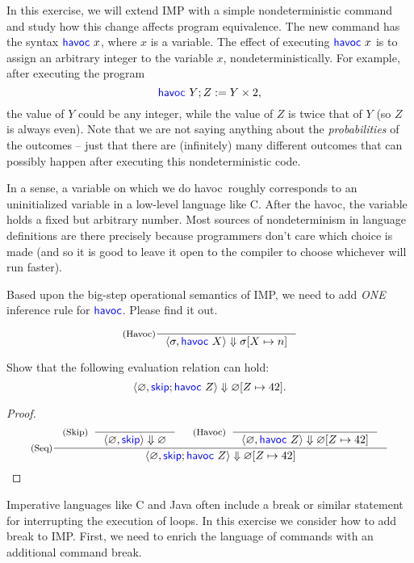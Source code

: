 \documentclass[11pt,a4paper]{article}
\let\emptyset\varnothing
\newcommand{\pair}[1]{\langle #1 \rangle}
\newcommand{\evalC}[3]{\pair{#1, #2} \Downarrow #3}
\newcommand{\kword}[1]{{\color{blue} \textsf{#1}}}
\newcommand{\Skip}{\kword{skip}}
\newcommand{\Havoc}{\kword{havoc}}
\newcommand{\Break}{\kword{break}}
\begin{document}
In this exercise, we will extend IMP with a simple nondeterministic command and study how this change affects program equivalence.
The new command has the syntax $\Havoc~x$, where $x$ is a variable.
The effect of executing $\Havoc~x$ is to assign an arbitrary integer to the variable $x$, nondeterministically.
For example, after executing the program
$$\Havoc~Y;Z:=Y\times 2,$$
the value of $Y$ could be any integer, while the value of $Z$ is twice that of $Y$ (so $Z$ is always even).
Note that we are not saying anything about the \emph{probabilities} of the outcomes -- just that there are (infinitely) many different outcomes that can possibly happen after executing this nondeterministic code.

In a sense, a variable on which we do \Havoc~roughly corresponds to an uninitialized variable in a low-level language like C.
After the \Havoc, the variable holds a fixed but arbitrary number.
Most sources of nondeterminism in language definitions are there precisely because programmers don't care which choice is made (and so it is good to leave it open to the compiler to choose whichever will run faster).

\subproblem Based upon the big-step operational semantics of IMP, we need to add \emph{ONE} inference rule for $\Havoc$.
Please find it out.

\begin{solution}
  $$\inference[(Havoc)]{}{\evalC{\sigma}{\Havoc~X}{\sigma[X \mapsto n]}}$$
\end{solution}

\subproblem Show that the following evaluation relation can hold:
$$\evalC{\emptyset}{\Skip;\Havoc~Z}{\emptyset[Z \mapsto 42]}.$$

\begin{proof}
  $$\inference[(Seq)]{\inference[(Skip)]{}{\evalC{\emptyset}{\Skip}{\emptyset}} &  \inference[(Havoc)]{}{\evalC{\emptyset}{\Havoc~Z}{\emptyset[Z \mapsto 42]}}}{\evalC{\emptyset}{\Skip;\Havoc~Z}{\emptyset[Z \mapsto 42]}}$$
\end{proof}

\newpage
{}

Imperative languages like C and Java often include a break or similar statement for interrupting the execution of loops.
In this exercise we consider how to add break to IMP.
First, we need to enrich the language of commands with an additional command \Break.
\end{document}
